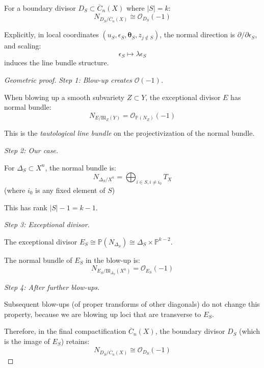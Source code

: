 \begin{theorem}\label{thm:normal-bundle-formula}
For a boundary divisor $D_S \subset \overline{C}_n(X)$ where $|S| = k$:
\[N_{D_S/\overline{C}_n(X)} \cong \mathcal{O}_{D_S}(-1)\]

Explicitly, in local coordinates $(u_S, \epsilon_S, \boldsymbol{\theta}_S, z_{j \notin S})$,
the normal direction is $\partial/\partial \epsilon_S$, and scaling:
\[\epsilon_S \mapsto \lambda \epsilon_S\]
induces the line bundle structure.
\end{theorem}

\begin{proof}[Geometric proof]
\emph{Step 1: Blow-up creates $\mathcal{O}(-1)$.}

When blowing up a smooth subvariety $Z \subset Y$, the exceptional divisor $E$ has normal
bundle:
\[N_{E/\text{Bl}_Z(Y)} = \mathcal{O}_{\mathbb{P}(N_Z)}(-1)\]

This is the \emph{tautological line bundle} on the projectivization of the normal bundle.

\emph{Step 2: Our case.}

For $\Delta_S \subset X^n$, the normal bundle is:
\[N_{\Delta_S/X^n} = \bigoplus_{i \in S, i \neq i_0} T_X\]
(where $i_0$ is any fixed element of $S$)

This has rank $|S| - 1 = k - 1$.

\emph{Step 3: Exceptional divisor.}

The exceptional divisor $E_S \cong \mathbb{P}(N_{\Delta_S}) \cong \Delta_S \times \mathbb{P}^{k-2}$.

The normal bundle of $E_S$ in the blow-up is:
\[N_{E_S/\text{Bl}_{\Delta_S}(X^n)} = \mathcal{O}_{E_S}(-1)\]

\emph{Step 4: After further blow-ups.}

Subsequent blow-ups (of proper transforms of other diagonals) do not change this property,
because we are blowing up loci that are transverse to $E_S$.

Therefore, in the final compactification $\overline{C}_n(X)$, the boundary divisor $D_S$
(which is the image of $E_S$) retains:
\[N_{D_S/\overline{C}_n(X)} \cong \mathcal{O}_{D_S}(-1)\]
\end{proof}

